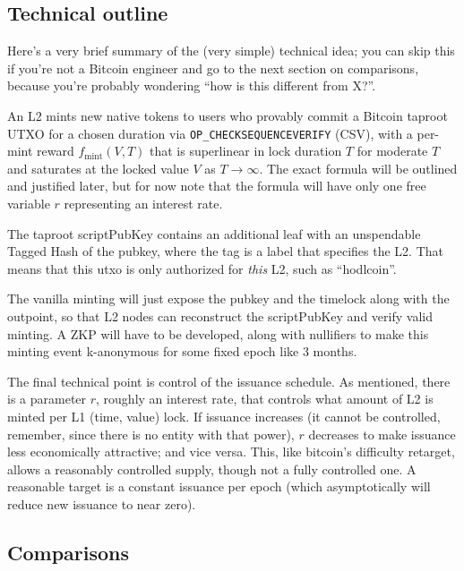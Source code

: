 \documentclass[11pt,a4paper]{article}
\newcommand{\fmint}{f_{\mathrm{mint}}}
\begin{document}
\subsection{Technical outline}
Here's a very brief summary of the (very simple) technical idea; you can skip this if you're not a Bitcoin engineer and go to the next section on comparisons, because you're probably wondering ``how is this different from X?''.

An L2 mints new native tokens to users who provably commit a Bitcoin taproot UTXO for a chosen duration via \texttt{OP\_CHECKSEQUENCEVERIFY} (CSV), with a per-mint reward $\fmint(V, T)$ that is superlinear in lock duration $T$ for moderate $T$ and saturates at the locked value $V$ as $T \to \infty$. The exact formula will be outlined and justified later, but for now note that the formula will have only one free variable $r$ representing an interest rate.

The taproot scriptPubKey contains an additional leaf with an unspendable Tagged Hash of the pubkey, where the tag is a label that specifies the L2. That means that this utxo is only authorized for \emph{this} L2, such as ``hodlcoin''.

The vanilla minting will just expose the pubkey and the timelock along with the outpoint, so that L2 nodes can reconstruct the scriptPubKey and verify valid minting. A ZKP will have to be developed, along with nullifiers to make this minting event k-anonymous for some fixed epoch like 3 months.

The final technical point is control of the issuance schedule. As mentioned, there is a parameter $r$, roughly an interest rate, that controls what amount of L2 is minted per L1 (time, value) lock. If issuance increases (it cannot be controlled, remember, since there is no entity with that power), $r$ decreases to make issuance less economically attractive; and vice versa. This, like bitcoin's difficulty retarget, allows a reasonably controlled supply, though not a fully controlled one. A reasonable target is a constant issuance per epoch (which asymptotically will reduce new issuance to near zero).

\subsection{Comparisons}
\end{document}
